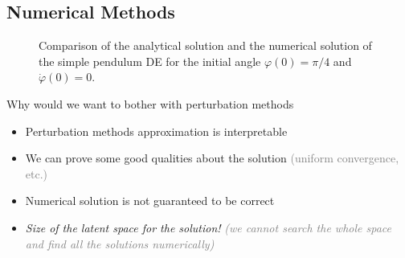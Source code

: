 \subsection{Numerical Methods}%
\label{sub:numerical_methods}

\begin{frame}
\end{frame}

\begin{frame}
    \begin{figure}[h!]
        \centering
        \caption{Comparison of the analytical solution and the numerical solution of the simple pendulum DE for
        the initial angle \(\varphi(0) = \pi/4 \) and \(\dot{\varphi}(0) = 0\).}
    \end{figure}
\end{frame}

\begin{frame}
    Why would we want to bother with perturbation methods \pause \pause
    \begin{itemize}
        \item<+-> Perturbation methods approximation is interpretable
        \item<+-> We can prove some good qualities about the solution \pause \textcolor{gray}{(uniform convergence, etc.)} \pause
        \item<+-> Numerical solution is not guaranteed to be correct
        \item<+-> \emph{Size of the latent space for the solution!} \pause \textcolor{gray}{\emph{(we cannot search the whole space and find
            all the solutions numerically)}}
    \end{itemize}
\end{frame}

